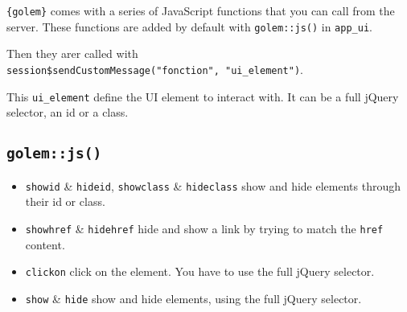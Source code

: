 \documentclass[]{book}
\newenvironment{Shaded}{\begin{snugshade}}{\end{snugshade}}
\newcommand{\KeywordTok}[1]{\textcolor[rgb]{0.13,0.29,0.53}{\textbf{#1}}}
\newcommand{\NormalTok}[1]{#1}
\newcommand{\OperatorTok}[1]{\textcolor[rgb]{0.81,0.36,0.00}{\textbf{#1}}}
\newcommand{\StringTok}[1]{\textcolor[rgb]{0.31,0.60,0.02}{#1}}
\providecommand{\tightlist}{%
  \setlength{\itemsep}{0pt}\setlength{\parskip}{0pt}}
\begin{document}
\texttt{\{golem\}} comes with a series of JavaScript functions that you can call from the server. These functions are added by default with \texttt{golem::js()} in \texttt{app\_ui}.

Then they arer called with \texttt{session\$sendCustomMessage("fonction",\ "ui\_element")}.

This \texttt{ui\_element} define the UI element to interact with. It can be a full jQuery selector, an id or a class.

\hypertarget{golemjs}{%
\subsection{\texorpdfstring{\texttt{golem::js()}}{golem::js()}}\label{golemjs}}

\begin{itemize}
\tightlist
\item
  \texttt{showid} \& \texttt{hideid}, \texttt{showclass} \& \texttt{hideclass} show and hide elements through their id or class.
\end{itemize}

\begin{Shaded}
\end{Shaded}

\begin{itemize}
\tightlist
\item
  \texttt{showhref} \& \texttt{hidehref} hide and show a link by trying to match the \texttt{href} content.
\end{itemize}

\begin{Shaded}
\end{Shaded}

\begin{itemize}
\item
  \texttt{clickon} click on the element. You have to use the full jQuery selector.
\item
  \texttt{show} \& \texttt{hide} show and hide elements, using the full jQuery selector.
\end{itemize}
\end{document}
